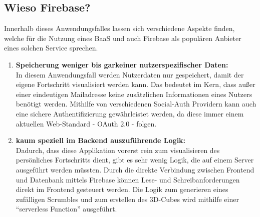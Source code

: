 \begin{definition}
    \subsection{Wieso Firebase?}
    Innerhalb dieses Anwendungsfalles lassen sich verschiedene Aspekte finden, welche für die Nutzung eines BaaS und auch Firebase als populären Anbieter eines solchen Service sprechen.
    \begin{enumerate}
        \item \textbf{Speicherung weniger bis garkeiner nutzerspezifischer Daten:}\\
              In diesem Anwendungsfall werden Nutzerdaten nur gespeichert, damit der eigene Fortschritt visualisiert werden kann. Das bedeutet im Kern, dass außer einer eindeutigen Mailadresse keine zusätzlichen Informationen eines Nutzers benötigt werden. Mithilfe von verschiedenen Social-Auth Providern kann auch eine sichere Authentifizierung gewährleistet werden, da diese immer einem aktuellen Web-Standard - OAuth 2.0 - folgen.
        \item \textbf{kaum speziell im Backend auszuführende Logik:}\\
              Dadurch, dass diese Applikation vorerst rein zum visualisieren des persönliches Fortschritts dient, gibt es sehr wenig Logik, die auf einem Server ausgeführt werden müssten. Durch die direkte Verbindung zwischen Frontend und Datenbank mittels Firebase können Lese- und Schreibanforderungen direkt im Frontend gesteuert werden. Die Logik zum generieren eines zufälligen Scrumbles und zum erstellen des 3D-Cubes wird mithilfe einer \enquote{serverless Function} ausgeführt.
    \end{enumerate}
\end{definition}
